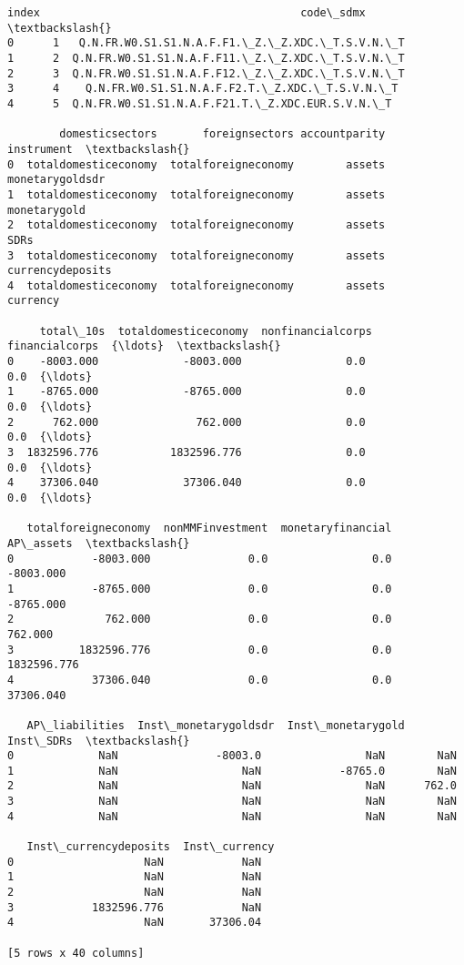 \documentclass[11pt]{article}
\begin{document}
    \begin{Verbatim}[commandchars=\\\{\}]
   index                                        code\_sdmx  \textbackslash{}
0      1   Q.N.FR.W0.S1.S1.N.A.F.F1.\_Z.\_Z.XDC.\_T.S.V.N.\_T
1      2  Q.N.FR.W0.S1.S1.N.A.F.F11.\_Z.\_Z.XDC.\_T.S.V.N.\_T
2      3  Q.N.FR.W0.S1.S1.N.A.F.F12.\_Z.\_Z.XDC.\_T.S.V.N.\_T
3      4    Q.N.FR.W0.S1.S1.N.A.F.F2.T.\_Z.XDC.\_T.S.V.N.\_T
4      5  Q.N.FR.W0.S1.S1.N.A.F.F21.T.\_Z.XDC.EUR.S.V.N.\_T

        domesticsectors       foreignsectors accountparity        instrument  \textbackslash{}
0  totaldomesticeconomy  totalforeigneconomy        assets   monetarygoldsdr
1  totaldomesticeconomy  totalforeigneconomy        assets      monetarygold
2  totaldomesticeconomy  totalforeigneconomy        assets              SDRs
3  totaldomesticeconomy  totalforeigneconomy        assets  currencydeposits
4  totaldomesticeconomy  totalforeigneconomy        assets          currency

     total\_10s  totaldomesticeconomy  nonfinancialcorps  financialcorps  {\ldots}  \textbackslash{}
0    -8003.000             -8003.000                0.0             0.0  {\ldots}
1    -8765.000             -8765.000                0.0             0.0  {\ldots}
2      762.000               762.000                0.0             0.0  {\ldots}
3  1832596.776           1832596.776                0.0             0.0  {\ldots}
4    37306.040             37306.040                0.0             0.0  {\ldots}

   totalforeigneconomy  nonMMFinvestment  monetaryfinancial    AP\_assets  \textbackslash{}
0            -8003.000               0.0                0.0    -8003.000
1            -8765.000               0.0                0.0    -8765.000
2              762.000               0.0                0.0      762.000
3          1832596.776               0.0                0.0  1832596.776
4            37306.040               0.0                0.0    37306.040

   AP\_liabilities  Inst\_monetarygoldsdr  Inst\_monetarygold  Inst\_SDRs  \textbackslash{}
0             NaN               -8003.0                NaN        NaN
1             NaN                   NaN            -8765.0        NaN
2             NaN                   NaN                NaN      762.0
3             NaN                   NaN                NaN        NaN
4             NaN                   NaN                NaN        NaN

   Inst\_currencydeposits  Inst\_currency
0                    NaN            NaN
1                    NaN            NaN
2                    NaN            NaN
3            1832596.776            NaN
4                    NaN       37306.04

[5 rows x 40 columns]
    \end{Verbatim}
\end{document}
